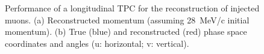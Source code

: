 \begin{refsection}
        \begin{figure}
            \centering
            \caption[muEDM: \grid reconstruction]{Performance of a longitudinal TPC for the reconstruction of injected muons. (a) Reconstructed momentum (assuming \SI{28}{MeV/c} initial momentum). (b) True (blue) and reconstructed (red) phase space coordinates and angles (u: horizontal; v: vertical).}
        \label{fig:tpc_reso}
        \end{figure}
        

\end{refsection}
